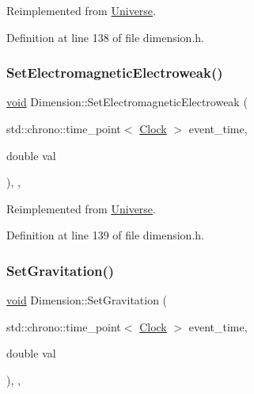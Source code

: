 Reimplemented from \mbox{\hyperlink{class_universe_aa981fc7e252b1fbbb675f0371860954d}{Universe}}.



Definition at line 138 of file dimension.\+h.

\mbox{\label{class_dimension_aead73fc6a25388d14b514b2170735b1b}} 
\subsubsection{\texorpdfstring{Set\+Electromagnetic\+Electroweak()}{SetElectromagneticElectroweak()}}
{\footnotesize\ttfamily \mbox{\hyperlink{glad_8h_a950fc91edb4504f62f1c577bf4727c29}{void}} Dimension\+::\+Set\+Electromagnetic\+Electroweak (\begin{DoxyParamCaption}\item[{std\+::chrono\+::time\+\_\+point$<$ \mbox{\hyperlink{universe_8h_a0ef8d951d1ca5ab3cfaf7ab4c7a6fd80}{Clock}} $>$}]{event\+\_\+time,  }\item[{double}]{val }\end{DoxyParamCaption})\hspace{0.3cm}{\ttfamily [inline]}, {\ttfamily [final]}, {\ttfamily [virtual]}}



Reimplemented from \mbox{\hyperlink{class_universe_a608aa95698380f791a0ffba45cc1bee3}{Universe}}.



Definition at line 139 of file dimension.\+h.

\mbox{\label{class_dimension_aeec6887382d09e3d78382582ff4e7c33}} 
\subsubsection{\texorpdfstring{Set\+Gravitation()}{SetGravitation()}}
{\footnotesize\ttfamily \mbox{\hyperlink{glad_8h_a950fc91edb4504f62f1c577bf4727c29}{void}} Dimension\+::\+Set\+Gravitation (\begin{DoxyParamCaption}\item[{std\+::chrono\+::time\+\_\+point$<$ \mbox{\hyperlink{universe_8h_a0ef8d951d1ca5ab3cfaf7ab4c7a6fd80}{Clock}} $>$}]{event\+\_\+time,  }\item[{double}]{val }\end{DoxyParamCaption})\hspace{0.3cm}{\ttfamily [inline]}, {\ttfamily [final]}, {\ttfamily [virtual]}}



